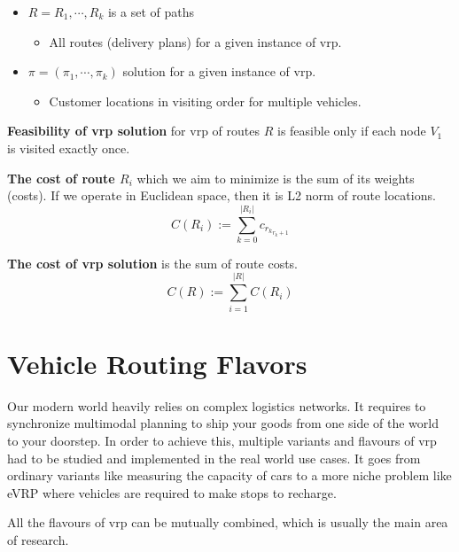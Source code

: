 \begin{itemize}
\begin{itemize}
        \end{itemize}
        \item $R = R_1, \cdots, R_k$ is a set of paths
        \begin{itemize}
            \item All routes (delivery plans) for a given instance of \gls{vrp}.
        \end{itemize}
        \item $\pi = (\pi_1, \cdots, \pi_k)$ solution for a given instance of \gls{vrp}.
        \begin{itemize}
            \item Customer locations in visiting order for multiple vehicles.
        \end{itemize}
    \end{itemize}
    
    \textbf{Feasibility of \gls{vrp} solution} for \gls{vrp} of routes $R$ is feasible only if each node $V_1$ is visited exactly once.
    
    \textbf{The cost of route $R_i$} which we aim to minimize is the sum of its weights (costs). If we operate in Euclidean space, then it is L2 norm of route locations.
    \begin{equation}
        C(R_i) := \sum_{k = 0}^{|R_i|} c_{r_k}_{r_k+1}
    \end{equation}
    
    \textbf{The cost of \gls{vrp} solution} is the sum of route costs.
    \begin{equation}
        C(R) := \sum_{i = 1}^{|R|} C(R_i)
    \end{equation}
    
\section{Vehicle Routing Flavors}
Our modern world heavily relies on complex logistics networks. It requires to synchronize multimodal planning to ship your goods from one side of the world to your doorstep. In order to achieve this, multiple variants and flavours of \gls{vrp} had to be studied and implemented in the real world use cases. It goes from ordinary variants like measuring the capacity of cars to a more niche problem like eVRP where vehicles are required to make stops to recharge.

All the flavours of \gls{vrp} can be mutually combined, which is usually the main area of research.


